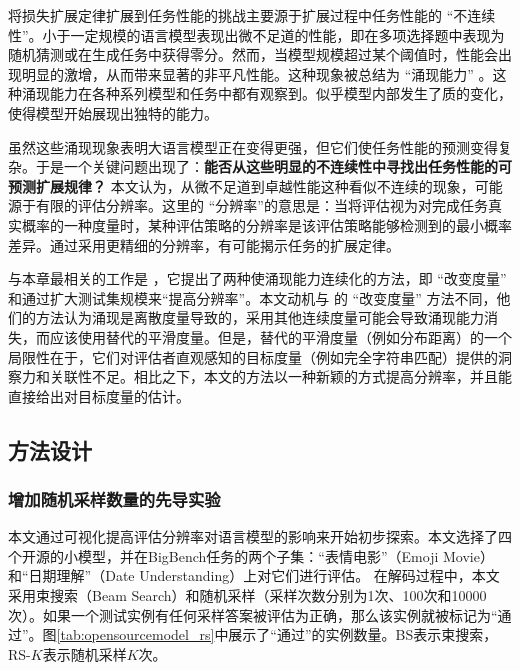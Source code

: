 将损失扩展定律扩展到任务性能的挑战主要源于扩展过程中任务性能的 “不连续性”。小于一定规模的语言模型表现出微不足道的性能，即在多项选择题中表现为随机猜测或在生成任务中获得零分。然而，当模型规模超过某个阈值时，性能会出现明显的激增，从而带来显著的非平凡性能。这种现象被总结为 “涌现能力” \citep{srivastava2022beyond, wei2022emergent}。这种涌现能力在各种系列模型和任务中都有观察到。似乎模型内部发生了质的变化，使得模型开始展现出独特的能力。

虽然这些涌现现象表明大语言模型正在变得更强，但它们使任务性能的预测变得复杂。于是一个关键问题出现了：\textbf{能否从这些明显的不连续性中寻找出任务性能的可预测扩展规律？} 本文认为，从微不足道到卓越性能这种看似不连续的现象，可能源于有限的评估分辨率。这里的 “分辨率”的意思是：当将评估视为对完成任务真实概率的一种度量时，某种评估策略的分辨率是该评估策略能够检测到的最小概率差异。通过采用更精细的分辨率，有可能揭示任务的扩展定律。 

与本章最相关的工作是 \citet{schaeffer2023emergent}，它提出了两种使涌现能力连续化的方法，即 “改变度量” 和通过扩大测试集规模来“提高分辨率”。本文动机与 \citet{schaeffer2023emergent} 的 “改变度量” 方法不同，他们的方法认为涌现是离散度量导致的，采用其他连续度量可能会导致涌现能力消失，而应该使用替代的平滑度量。但是，替代的平滑度量（例如分布距离）的一个局限性在于，它们对评估者直观感知的目标度量（例如完全字符串匹配）提供的洞察力和关联性不足。相比之下，本文的方法以一种新颖的方式提高分辨率，并且能直接给出对目标度量的估计。

\subsection{方法设计}
\subsubsection{增加随机采样数量的先导实验}
\label{sec:pilot}
本文通过可视化提高评估分辨率对语言模型的影响来开始初步探索。本文选择了四个开源的小模型，并在BigBench任务的两个子集\citep{srivastava2022beyond}：“表情电影”（Emoji Movie）和“日期理解”（Date Understanding）上对它们进行评估。
在解码过程中，本文采用束搜索（Beam Search）和随机采样（采样次数分别为1次、100次和10000次）。如果一个测试实例有任何采样答案被评估为正确，那么该实例就被标记为“通过”。图\ref{tab:opensourcemodel_rs}中展示了“通过”的实例数量。BS表示束搜索，RS-$K$表示随机采样$K$次。

